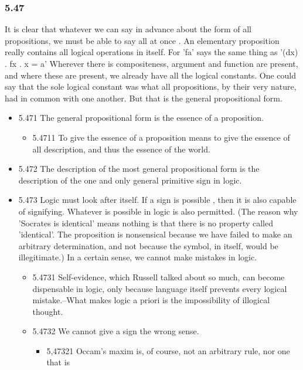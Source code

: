 \documentclass[11pt]{article}
\begin{document}
\subsubsection*{5.47}
\label{sec:org684bc07}
It is clear that whatever we can say in advance about the form of all
propositions, we must be able to say all at once . An elementary
proposition really contains all logical operations in itself. For 'fa' says
the same thing as '(dx) . fx . x = a' Wherever there is compositeness,
argument and function are present, and where these are present, we already
have all the logical constants. One could say that the sole logical
constant was what all propositions, by their very nature, had in common
with one another. But that is the general propositional form.
\begin{itemize}
\item 5.471
\label{sec:org28d6989}
The general propositional form is the essence of a proposition.
\begin{itemize}
\item 5.4711
\label{sec:org1a17a2d}
To give the essence of a proposition means to give the essence of
all description, and thus the essence of the world.
\end{itemize}
\item 5.472
\label{sec:org019b61a}
The description of the most general propositional form is the
description of the one and only general primitive sign in logic.
\item 5.473
\label{sec:org7bc28e0}
Logic must look after itself. If a sign is possible , then it is also
capable of signifying. Whatever is possible in logic is also permitted.
(The reason why 'Socrates is identical' means nothing is that there is no
property called 'identical'. The proposition is nonsensical because we have
failed to make an arbitrary determination, and not because the symbol, in
itself, would be illegitimate.) In a certain sense, we cannot make mistakes
in logic.
\begin{itemize}
\item 5.4731
\label{sec:org6447050}
Self-evidence, which Russell talked about so much, can become
dispensable in logic, only because language itself prevents every logical
mistake.--What makes logic a priori is the impossibility of illogical
thought.
\item 5.4732
\label{sec:org04d7c74}
We cannot give a sign the wrong sense.
\begin{itemize}
\item 5,47321
\label{sec:orgf9c3c1d}
Occam's maxim is, of course, not an arbitrary rule, nor one that is

\end{itemize}
\end{itemize}
\end{itemize}
\end{document}
